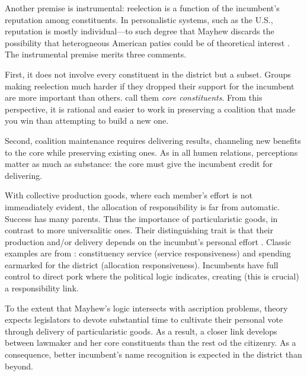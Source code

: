 \documentclass[letter,12pt]{article}
\begin{document}
Another premise is instrumental: reelection is a function of the incumbent's reputation among constituents. In personalistic systems, such as the U.S., reputation is mostly individual---to such degree that Mayhew discards the possibility that heterogneous American paties could be of theoretical interest \citep[but revisionists rescued party relevance in Myhew's framework,][]{cox.mccubbins.1993,aldrich.1995}. The instrumental premise merits three comments. 

First, it does not involve every constituent in the district but a subset. Groups making reelection much harder if they dropped their support for the incumbent are more important than others. \citet{cox.mccubbins.1986} call them \emph{core constituents}. From this perspective, it is rational and easier to work in preserving a coalition that made you win than attempting to build a new one.

Second, coalition maintenance requires delivering results, channeling new benefits to the core while preserving existing ones. As in all humen relations, perceptions matter as much as substance: the core must give the incumbent credit for delivering. 

With collective production goods, where each member's effort is not immeadiately evident, the allocation of responsibility is far from automatic. Success has many parents. Thus the importance of particularistic goods, in contrast to more universalitic ones. Their distinguishing trait is that their production and/or delivery depends on the incumbnt's personal effort \citep{haggard.mccubbins.2001}. Classic examples are from \citet{cain.etal.1987}: constituency service (service responsiveness) and spending earmarked for the district (allocation responsiveness). Incumbents have full control to direct pork where the political logic indicates, creating (this is crucial) a responsibility link.

To the extent that Mayhew's logic intersects with ascription problems, theory expects legislators to devote substantial time to cultivate their personal vote through delivery of particularistic goods. As a result, a closer link develops between lawmaker and her core constituents than the rest od the citizenry. As a consequence, better incumbent's name recognition is expected in the district than beyond. 

\end{document}

